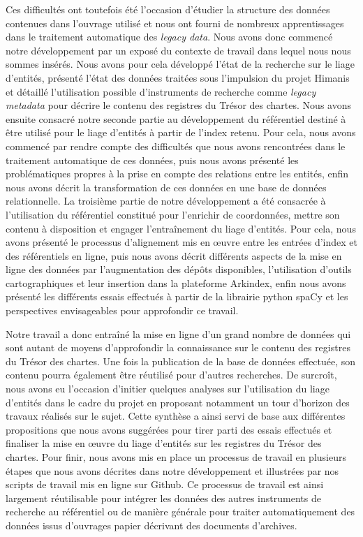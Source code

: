\documentclass[a4paper,12pt,twoside]{book}
\begin{document}
	Ces difficultés ont toutefois été l'occasion d'étudier la structure des données contenues dans l'ouvrage utilisé et nous ont fourni de nombreux apprentissages dans le traitement automatique des \textit{legacy data}. Nous avons donc commencé notre développement par un exposé du contexte de travail dans lequel nous nous sommes insérés. Nous avons pour cela développé l'état de la recherche sur le liage d'entités, présenté l'état des données traitées sous l'impulsion du projet Himanis et détaillé l'utilisation possible d'instruments de recherche comme \textit{legacy metadata} pour décrire le contenu des registres du Trésor des chartes. Nous avons ensuite consacré notre seconde partie au développement du référentiel destiné à être utilisé pour le liage d'entités à partir de l'index retenu. Pour cela, nous avons commencé par rendre compte des difficultés que nous avons rencontrées dans le traitement automatique de ces données, puis nous avons présenté les problématiques propres à la prise en compte des relations entre les entités, enfin nous avons décrit la transformation de ces données en une base de données relationnelle. La troisième partie de notre développement a été consacrée à l'utilisation du référentiel constitué pour l'enrichir de coordonnées, mettre son contenu à disposition et engager l'entraînement du liage d'entités. Pour cela, nous avons présenté le processus d'alignement mis en œuvre entre les entrées d'index et des référentiels en ligne, puis nous avons décrit différents aspects de la mise en ligne des données par l'augmentation des dépôts disponibles, l'utilisation d'outils cartographiques et leur insertion dans la plateforme Arkindex, enfin nous avons présenté les différents essais effectués à partir de la librairie python spaCy et les perspectives envisageables pour approfondir ce travail.
	
	Notre travail a donc entraîné la mise en ligne d'un grand nombre de données qui sont autant de moyens d'approfondir la connaissance sur le contenu des registres du Trésor des chartes. Une fois la publication de la base de données effectuée, son contenu pourra également être réutilisé pour d'autres recherches. De surcroît, nous avons eu l'occasion d'initier quelques analyses sur l'utilisation du liage d'entités dans le cadre du projet en proposant notamment un tour d'horizon des travaux réalisés sur le sujet. Cette synthèse a ainsi servi de base aux différentes propositions que nous avons suggérées pour tirer parti des essais effectués et finaliser la mise en œuvre du liage d'entités sur les registres du Trésor des chartes. Pour finir, nous avons mis en place un processus de travail en plusieurs étapes que nous avons décrites dans notre développement et illustrées par nos scripts de travail mis en ligne sur Github. Ce processus de travail est ainsi largement réutilisable pour intégrer les données des autres instruments de recherche au référentiel ou de manière générale pour traiter automatiquement des données issus d'ouvrages papier décrivant des documents d'archives.
	
\end{document}
